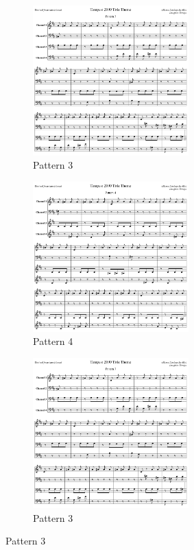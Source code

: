 \begin{figure}[H]
{\begin{subfigure}{0.43\textwidth}
        \includegraphics[width=6cm]{src/titletune/sheet_music/title_no_3_page_1001.png}%
      \caption*{Pattern 3}
    \end{subfigure}
    \begin{subfigure}{0.43\textwidth}
        \includegraphics[width=6cm]{src/titletune/sheet_music/title_no_4_page_1001.png}%
      \caption*{Pattern 4}
    \end{subfigure}
    \hspace{1.5cm}
    \begin{subfigure}{0.43\textwidth}
        \includegraphics[width=6cm]{src/titletune/sheet_music/title_no_3_page_1001.png}%
      \caption*{Pattern 3}
    \end{subfigure}
}
\end{figure}

